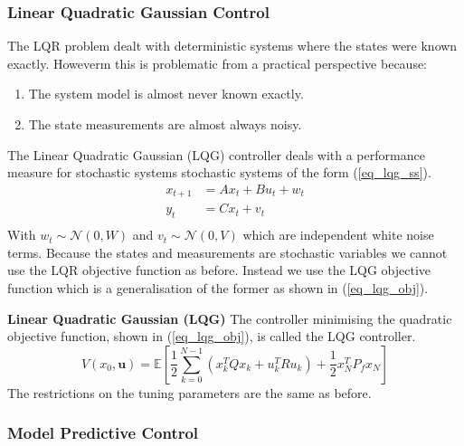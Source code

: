 \documentclass[../masters.tex]{subfiles}
\begin{document}
\subsubsection{Linear Quadratic Gaussian Control}
The LQR problem dealt with deterministic systems where the states were known exactly. Howeverm this is problematic from a practical perspective because:
\begin{enumerate}
\item
The system model is almost never known exactly.
\item
The state measurements are almost always noisy.
\end{enumerate}
The Linear Quadratic Gaussian (LQG) controller deals with a performance measure for stochastic systems stochastic systems of the form (\ref{eq_lqg_ss}).
\begin{equation}
\begin{aligned}
x_{t+1} &= Ax_t+ Bu_t + w_t \\
y_t &= Cx_t +v_t \\
\end{aligned}
\label{eq_lqg_ss}
\end{equation}
With  $w_t \sim \mathcal{N}(0, W)$ and $v_t \sim \mathcal{N}(0, V)$ which are independent white noise terms. 
Because the states and measurements are stochastic variables we cannot use the LQR objective function as before. Instead we use the LQG objective function which is a generalisation of the former as shown in (\ref{eq_lqg_obj}).
\begin{defn}
\textbf{Linear Quadratic Gaussian (LQG)} The controller minimising the quadratic objective function, shown in (\ref{eq_lqg_obj}), is called the LQG controller. 
\begin{equation}
V(x_0, \mathbf{u}) = \mathbb{E}\left[ \frac{1}{2}\sum_{k=0}^{N-1} \left( x_k^TQx_k + u_k^TRu_k \right) + \frac{1}{2}x_N^TP_fx_N \right]
\label{eq_lqg_obj}
\end{equation}
The restrictions on the tuning parameters are the same as before.
\end{defn}

\subsubsection{Model Predictive Control}









\end{document}

